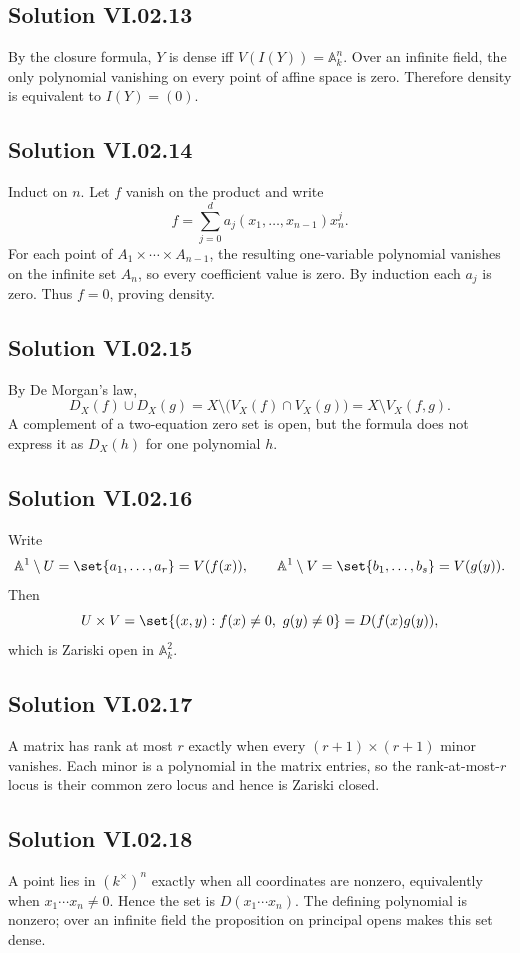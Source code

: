 \subsection*{Solution VI.02.13}
By the closure formula, \(Y\) is dense iff \(V(I(Y))=\mathbb A_k^n\).  Over an infinite
field, the only polynomial vanishing on every point of affine space is zero.  Therefore
density is equivalent to \(I(Y)=(0)\).

\subsection*{Solution VI.02.14}
Induct on \(n\).  Let \(f\) vanish on the product and write
\[
f=\sum_{j=0}^d a_j(x_1,\dots,x_{n-1})x_n^j.
\]
For each point of \(A_1\times\cdots\times A_{n-1}\), the resulting one-variable polynomial
vanishes on the infinite set \(A_n\), so every coefficient value is zero.  By induction each
\(a_j\) is zero.  Thus \(f=0\), proving density.

\subsection*{Solution VI.02.15}
By De Morgan's law,
\[
D_X(f)\cup D_X(g)=X\setminus\bigl(V_X(f)\cap V_X(g)\bigr)
=X\setminus V_X(f,g).
\]
A complement of a two-equation zero set is open, but the formula does not express it as
\(D_X(h)\) for one polynomial \(h\).

\subsection*{Solution VI.02.16}
Write
\[
\mathbb A^1\setminus U=\set{a_1,\dots,a_r}=V(f(x)),
\qquad
\mathbb A^1\setminus V=\set{b_1,\dots,b_s}=V(g(y)).
\]
Then
\[
U\times V=\set{(x,y):f(x)\neq0,\ g(y)\neq0}=D(f(x)g(y)),
\]
which is Zariski open in \(\mathbb A_k^2\).

\subsection*{Solution VI.02.17}
A matrix has rank at most \(r\) exactly when every \((r+1)\times(r+1)\) minor vanishes.
Each minor is a polynomial in the matrix entries, so the rank-at-most-\(r\) locus is their
common zero locus and hence is Zariski closed.

\subsection*{Solution VI.02.18}
A point lies in \((k^\times)^n\) exactly when all coordinates are nonzero, equivalently when
\(x_1\cdots x_n\neq0\).  Hence the set is \(D(x_1\cdots x_n)\).  The defining polynomial is
nonzero; over an infinite field the proposition on principal opens makes this set dense.
